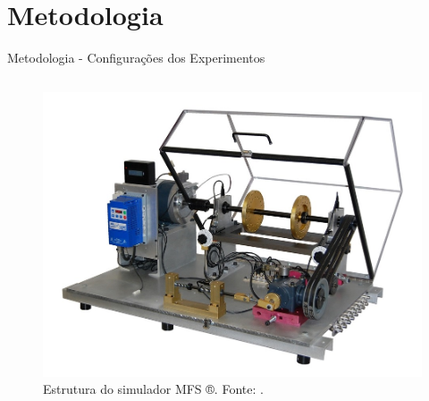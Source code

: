 \documentclass[aspectratio=169]{beamer}
\begin{document}
\section{Metodologia}
\begin{frame}{Metodologia - Configurações dos Experimentos}
	\begin{columns}
    	\begin{column}{0.50\textwidth}
			\begin{figure}[HT]
				\begin{center}
					\includegraphics[scale=.2]{../metodologia/img/real_plant.jpeg}
					\caption{Estrutura do simulador MFS ®. \newline
					Fonte: .}
					\label{fig:real_plant}
				\end{center}
			\end{figure}
     	\end{column}
		

\end{columns}
\end{frame}
\end{document}
